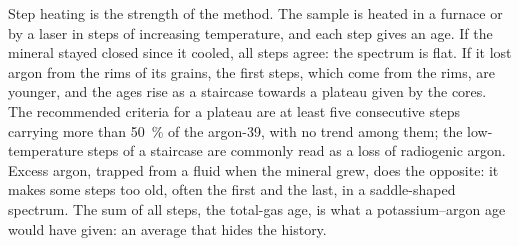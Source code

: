 Step heating is the strength of the method. The sample is heated in a furnace
or by a laser in steps of increasing temperature, and each step gives an age.
If the mineral stayed closed since it cooled, all steps agree: the spectrum is
flat. If it lost argon from the rims of its grains, the first steps, which
come from the rims, are younger, and the ages rise as a staircase towards a
plateau given by the cores. The recommended criteria for a plateau are at
least five consecutive steps carrying more than \qty{50}{\percent} of the
argon-39, with no trend among them; the low-temperature steps of a staircase
are commonly read as a loss of radiogenic argon. Excess argon, trapped from a
fluid when the mineral grew, does the opposite: it makes some steps too old,
often the first and the last, in a saddle-shaped spectrum. The sum of all
steps, the total-gas age, is what a potassium--argon age would have given: an
average that hides the history.

